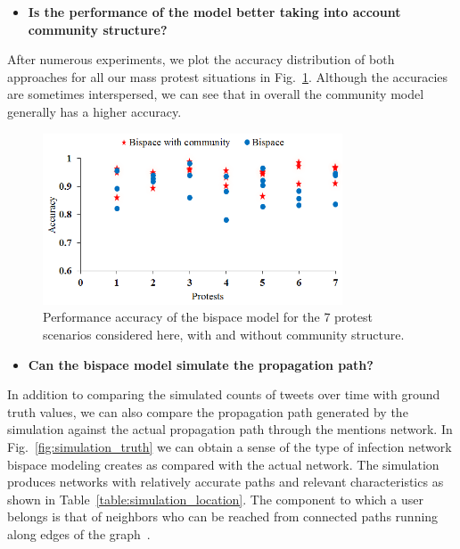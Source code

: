 \begin{itemize}
  \item \textbf{Is the performance of the model better
taking into account community structure?}
\end{itemize}
After numerous experiments, we plot the accuracy distribution of both approaches for all our mass protest situations
in Fig.~\ref{fig:GBM_compare_community}. Although the accuracies are
sometimes interspersed, we can see that in overall
the community model generally has a higher accuracy.

\begin{figure}[ht]
\centering
\includegraphics[width=3.5in] {figures/GBM_compare_community.png}
\caption{Performance accuracy of the bispace model for the 7
protest scenarios considered here,
with and without community structure.}
\label{fig:GBM_compare_community}
\end{figure}


\begin{itemize}
  \item \textbf{Can the bispace model simulate the propagation path?}
\end{itemize}
In addition to comparing the simulated counts of tweets over time with ground truth values, we can also compare the propagation path generated by the simulation against the actual propagation path
through the mentions network. In Fig.~\ref{fig:simulation_truth} we can
obtain a sense of the type of infection network bispace modeling creates as
compared with the actual network. The simulation produces networks with relatively accurate paths and relevant characteristics as shown in Table~\ref{table:simulation_location}. The component to which a user belongs is that of neighbors who can be reached from connected paths running along edges of the graph~\cite{newman2003structure}.


